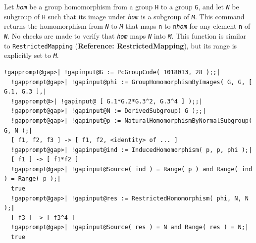 \documentclass[a4paper,11pt]{report}
\begin{document}
{{{ Let \mbox{\texttt{\mdseries\slshape hom}} be a group homomorphism from a group \texttt{H} to a group \texttt{G}, and let \mbox{\texttt{\mdseries\slshape N}} be subgroup of \texttt{H} such that its image under \mbox{\texttt{\mdseries\slshape hom}} is a subgroup of \mbox{\texttt{\mdseries\slshape M}}. This command returns the homomorphism from \mbox{\texttt{\mdseries\slshape N}} to \mbox{\texttt{\mdseries\slshape M}} that maps \texttt{n} to \texttt{n\texttt{}\mbox{\texttt{\mdseries\slshape hom}}} for any element \texttt{n} of \mbox{\texttt{\mdseries\slshape N}}. No checks are made to verify that \mbox{\texttt{\mdseries\slshape hom}} maps \mbox{\texttt{\mdseries\slshape N}} into \mbox{\texttt{\mdseries\slshape M}}. This function is similar to \texttt{RestrictedMapping} (\textbf{Reference: RestrictedMapping}), but its range is explicitly set to \mbox{\texttt{\mdseries\slshape M}}. }

 
\begin{Verbatim}[commandchars=!@|,fontsize=\small,frame=single,label=Example]
  !gapprompt@gap>| !gapinput@G := PcGroupCode( 1018013, 28 );;|
  !gapprompt@gap>| !gapinput@phi := GroupHomomorphismByImages( G, G, [ G.1, G.3 ],|
  !gapprompt@>| !gapinput@ [ G.1*G.2*G.3^2, G.3^4 ] );;|
  !gapprompt@gap>| !gapinput@N := DerivedSubgroup( G );;|
  !gapprompt@gap>| !gapinput@p := NaturalHomomorphismByNormalSubgroup( G, N );|
  [ f1, f2, f3 ] -> [ f1, f2, <identity> of ... ]
  !gapprompt@gap>| !gapinput@ind := InducedHomomorphism( p, p, phi );|
  [ f1 ] -> [ f1*f2 ]
  !gapprompt@gap>| !gapinput@Source( ind ) = Range( p ) and Range( ind ) = Range( p );|
  true
  !gapprompt@gap>| !gapinput@res := RestrictedHomomorphism( phi, N, N );|
  [ f3 ] -> [ f3^4 ]
  !gapprompt@gap>| !gapinput@Source( res ) = N and Range( res ) = N;|
  true
\end{Verbatim}
 }

 }

   
\end{document}
